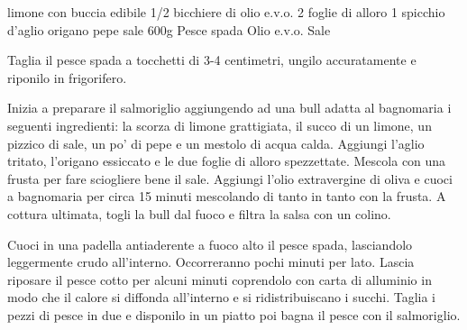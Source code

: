 
\begin{ingreds}
	 limone con buccia edibile
	1/2 bicchiere di olio e.v.o.
	2 foglie di alloro
	1 spicchio d'aglio
	origano
	pepe
	sale
\columnbreak
     	600g Pesce spada
     	Olio e.v.o.
	Sale
\end{ingreds}

\begin{method}
Taglia il pesce spada a tocchetti di 3-4 centimetri, ungilo accuratamente e riponilo in frigorifero.

Inizia a preparare il salmoriglio aggiungendo ad una bull adatta al bagnomaria i seguenti ingredienti: la scorza di limone grattigiata, il succo di un limone, un pizzico di sale, un po' di pepe e un mestolo di acqua calda. Aggiungi l'aglio tritato, l'origano essiccato e le due foglie di alloro spezzettate. Mescola con una frusta per fare sciogliere bene il sale. Aggiungi l'olio extravergine di oliva e cuoci a bagnomaria per circa 15 minuti mescolando di tanto in tanto con la frusta. A cottura ultimata, togli la bull dal fuoco e filtra la salsa con un colino.

Cuoci in una padella antiaderente a fuoco alto il pesce spada, lasciandolo leggermente crudo all'interno. Occorreranno pochi minuti per lato. Lascia riposare il pesce cotto per alcuni minuti coprendolo con carta di alluminio in modo che il calore si diffonda all'interno e si ridistribuiscano i succhi. Taglia i pezzi di pesce in due e disponilo in un piatto poi bagna il pesce con il salmoriglio.

\end {method}



